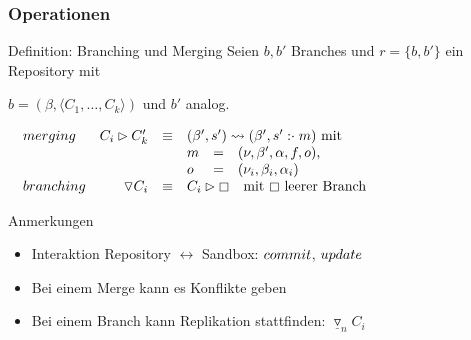 \documentclass[german]{beamer}
\begin{document}
\begin{frame}
  \frametitle{Operationen}

  \begin{block}{Definition: Branching und Merging}
    \medskip
    \hspace{1em}Seien $b, b'$ Branches und $r=\{b, b'\}$ ein Repository mit

    \hspace{1em}$b=(\beta, \langle C_1, \ldots, C_k\rangle)$ und $b'$ analog.
    \medskip

    $\begin{array}{@{\hspace{1em}}lrcl}
    \STRUCT{merging}      & C_i \rhd C_k'              & \equiv &
    (\beta', s') \leadsto
    (\beta', s'\APPEND m)\ \NORMAL{mit} \\
                          &                            &        &
                          \begin{array}{@{}lcl}
                          m   &=& (\nu, \beta', \alpha, f, o), \\
                          o   &=& (\nu_i, \beta_i, \alpha_i) \\
                          \end{array} \\
    \STRUCT{branching}    & \triangledown C_i          & \equiv &
    C_i\rhd \boxempty \quad \NORMAL{mit $\boxempty$ leerer Branch}
%
%
    \end{array}$
  \end{block}

  \begin{block}{Anmerkungen}
    \begin{itemize}
    \item Interaktion Repository $\leftrightarrow$ Sandbox:
      $\mathnormal{commit}$, $\mathnormal{update}$
    \item Bei einem Merge kann es Konflikte geben
    \item Bei einem Branch kann Replikation stattfinden:
      $\underline\triangledown_nC_i$
    \end{itemize}
  \end{block}
\end{frame}
\end{document}
